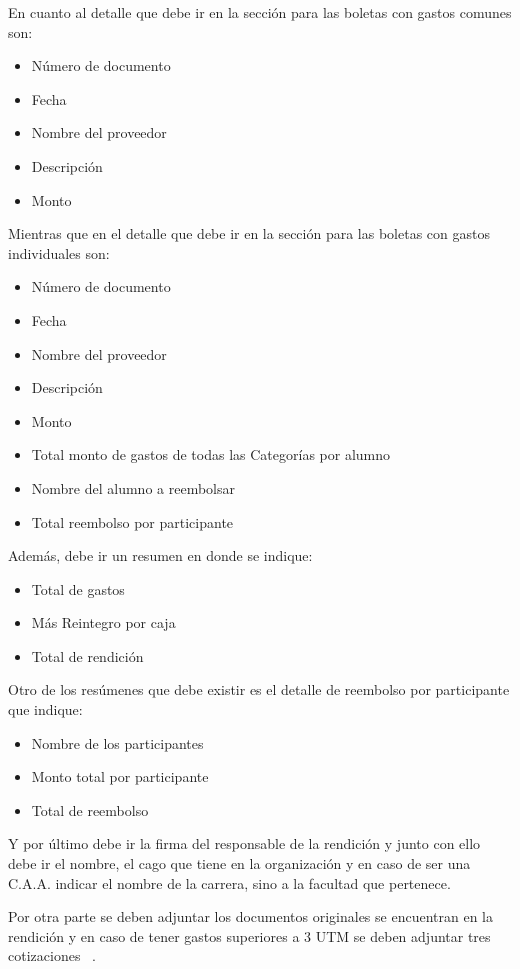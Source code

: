   En cuanto al detalle que debe ir en la sección para las boletas con gastos comunes son:
  
  \begin{itemize}
    \item Número de documento
    \item Fecha
    \item Nombre del proveedor
    \item Descripción
    \item Monto
  \end{itemize}
  
  Mientras que en el detalle que debe ir en la sección para las boletas con gastos individuales son:
  
  \begin{itemize}
    \item Número de documento
    \item Fecha
    \item Nombre del proveedor
    \item Descripción
    \item Monto
    \item Total monto de gastos de todas las Categorías por alumno
    \item Nombre del alumno a reembolsar
    \item Total reembolso por participante
  \end{itemize}
  
  Además, debe ir un resumen en donde se indique:
  
  \begin{itemize}
    \item Total de gastos
    \item Más Reintegro por caja
    \item Total de rendición
  \end{itemize}
  
  Otro de los resúmenes que debe existir es el detalle de reembolso por participante que indique:
  
  \begin{itemize}
    \item Nombre de los participantes
    \item Monto total por participante
    \item Total de reembolso
  \end{itemize}
  
  Y por último debe ir la firma del responsable de la rendición y junto con ello debe ir el nombre, el cago que tiene en la organización y en caso de ser una C.A.A. indicar el nombre de la carrera, sino a la facultad que pertenece.
  
  Por otra parte se deben adjuntar los documentos originales se encuentran en la rendición y en caso de tener gastos superiores a 3 UTM se deben adjuntar tres cotizaciones ~\cite{5}.
  
  